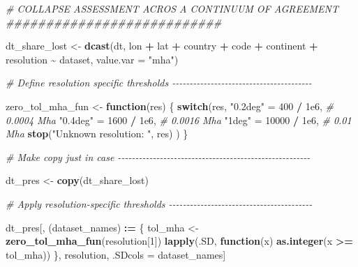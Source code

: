 \documentclass[
  11pt,
]{article}
\newenvironment{Shaded}{\begin{snugshade}}{\end{snugshade}}
\newcommand{\AttributeTok}[1]{\textcolor[rgb]{0.13,0.29,0.53}{#1}}
\newcommand{\CommentTok}[1]{\textcolor[rgb]{0.56,0.35,0.01}{\textit{#1}}}
\newcommand{\ControlFlowTok}[1]{\textcolor[rgb]{0.13,0.29,0.53}{\textbf{#1}}}
\newcommand{\DecValTok}[1]{\textcolor[rgb]{0.00,0.00,0.81}{#1}}
\newcommand{\FloatTok}[1]{\textcolor[rgb]{0.00,0.00,0.81}{#1}}
\newcommand{\FunctionTok}[1]{\textcolor[rgb]{0.13,0.29,0.53}{\textbf{#1}}}
\newcommand{\NormalTok}[1]{#1}
\newcommand{\OtherTok}[1]{\textcolor[rgb]{0.56,0.35,0.01}{#1}}
\newcommand{\SpecialCharTok}[1]{\textcolor[rgb]{0.81,0.36,0.00}{\textbf{#1}}}
\newcommand{\StringTok}[1]{\textcolor[rgb]{0.31,0.60,0.02}{#1}}
\begin{document}
\begin{Shaded}
\begin{Highlighting}[]
\CommentTok{\# COLLAPSE ASSESSMENT ACROS A CONTINUUM OF AGREEMENT \#\#\#\#\#\#\#\#\#\#\#\#\#\#\#\#\#\#\#\#\#\#\#\#\#\#\#}

\NormalTok{dt\_share\_lost }\OtherTok{\textless{}{-}} \FunctionTok{dcast}\NormalTok{(dt, lon }\SpecialCharTok{+}\NormalTok{ lat }\SpecialCharTok{+}\NormalTok{ country }\SpecialCharTok{+}\NormalTok{ code }\SpecialCharTok{+}\NormalTok{ continent }\SpecialCharTok{+}\NormalTok{ resolution }\SpecialCharTok{\textasciitilde{}}\NormalTok{ dataset,}
      \AttributeTok{value.var =} \StringTok{"mha"}\NormalTok{)}

\CommentTok{\# Define resolution specific thresholds {-}{-}{-}{-}{-}{-}{-}{-}{-}{-}{-}{-}{-}{-}{-}{-}{-}{-}{-}{-}{-}{-}{-}{-}{-}{-}{-}{-}{-}{-}{-}{-}{-}{-}{-}{-}{-}{-}{-}{-}}

\NormalTok{zero\_tol\_mha\_fun }\OtherTok{\textless{}{-}} \ControlFlowTok{function}\NormalTok{(res) \{}
  \ControlFlowTok{switch}\NormalTok{(res,}
    \StringTok{"0.2deg"} \OtherTok{=} \DecValTok{400}  \SpecialCharTok{/} \FloatTok{1e6}\NormalTok{, }\CommentTok{\# 0.0004 Mha}
    \StringTok{"0.4deg"} \OtherTok{=} \DecValTok{1600} \SpecialCharTok{/} \FloatTok{1e6}\NormalTok{, }\CommentTok{\# 0.0016 Mha}
    \StringTok{"1deg"} \OtherTok{=} \DecValTok{10000} \SpecialCharTok{/} \FloatTok{1e6}\NormalTok{,  }\CommentTok{\# 0.01 Mha}
    \FunctionTok{stop}\NormalTok{(}\StringTok{"Unknown resolution: "}\NormalTok{, res)}
\NormalTok{  )}
\NormalTok{\}}

\CommentTok{\# Make copy just in case {-}{-}{-}{-}{-}{-}{-}{-}{-}{-}{-}{-}{-}{-}{-}{-}{-}{-}{-}{-}{-}{-}{-}{-}{-}{-}{-}{-}{-}{-}{-}{-}{-}{-}{-}{-}{-}{-}{-}{-}{-}{-}{-}{-}{-}{-}{-}{-}{-}{-}{-}{-}{-}{-}{-}}

\NormalTok{dt\_pres }\OtherTok{\textless{}{-}} \FunctionTok{copy}\NormalTok{(dt\_share\_lost)}

\CommentTok{\# Apply resolution{-}specific thresholds {-}{-}{-}{-}{-}{-}{-}{-}{-}{-}{-}{-}{-}{-}{-}{-}{-}{-}{-}{-}{-}{-}{-}{-}{-}{-}{-}{-}{-}{-}{-}{-}{-}{-}{-}{-}{-}{-}{-}{-}{-}}

\NormalTok{dt\_pres[, (dataset\_names) }\SpecialCharTok{:=}\NormalTok{ \{}
\NormalTok{    tol\_mha }\OtherTok{\textless{}{-}} \FunctionTok{zero\_tol\_mha\_fun}\NormalTok{(resolution[}\DecValTok{1}\NormalTok{])}
    \FunctionTok{lapply}\NormalTok{(.SD, }\ControlFlowTok{function}\NormalTok{(x) }\FunctionTok{as.integer}\NormalTok{(x }\SpecialCharTok{\textgreater{}=}\NormalTok{ tol\_mha))}
\NormalTok{    \},}
\NormalTok{    resolution,}
\NormalTok{    .SDcols }\OtherTok{=}\NormalTok{ dataset\_names]}


\end{Highlighting}
\end{Shaded}
\end{document}
